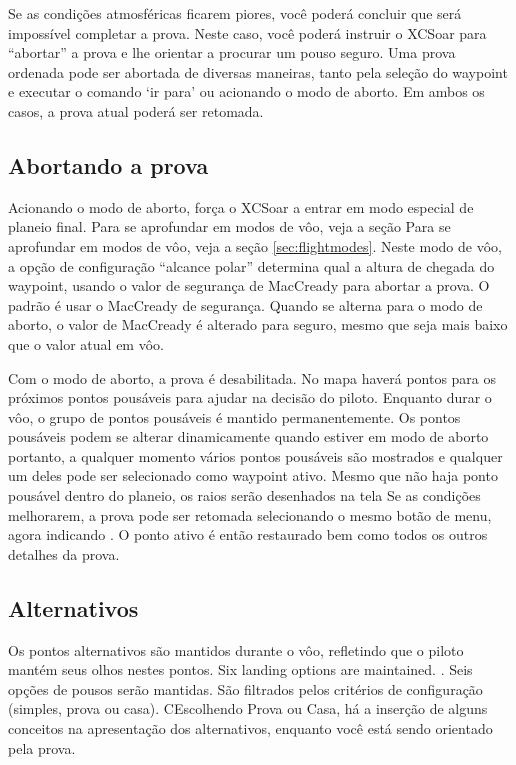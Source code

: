 Se as condições atmosféricas ficarem piores, você poderá concluir que será impossível completar a prova.  Neste caso, você poderá instruir o XCSoar para “abortar” a prova e lhe orientar a procurar um pouso seguro.  Uma prova ordenada pode ser abortada de diversas maneiras, tanto pela seleção do waypoint e executar o comando ‘ir para’ ou acionando o modo de aborto.  Em ambos os casos, a prova atual poderá ser retomada.

\subsection*{Abortando a prova}\label{sec:taskabort}
Acionando o modo de aborto, força o XCSoar a entrar em modo especial de planeio final.  Para se aprofundar em modos de vôo, veja a seção  Para se aprofundar em modos de vôo, veja a seção  \ref{sec:flightmodes}. Neste modo de vôo, a opção de configuração “alcance polar” determina qual a altura de chegada do waypoint, usando o valor de segurança de MacCready para abortar a prova.  O padrão é usar o MacCready de segurança.  Quando se alterna para o modo de aborto, o valor de MacCready é alterado para seguro, mesmo que seja mais baixo que o valor atual em vôo.

Com o modo de aborto, a prova é desabilitada.  No mapa haverá pontos para os próximos pontos pousáveis para ajudar na decisão do piloto.  Enquanto durar o vôo, o grupo de pontos pousáveis é mantido permanentemente.  Os pontos pousáveis podem se alterar dinamicamente quando estiver em modo de aborto portanto, a qualquer momento vários pontos pousáveis são mostrados e qualquer um deles pode ser selecionado como waypoint ativo.  Mesmo que não haja ponto pousável dentro do planeio, os raios serão desenhados na tela
Se as condições melhorarem, a prova pode ser retomada selecionando o mesmo botão de menu, agora indicando . O ponto ativo é então restaurado bem como todos os outros detalhes da prova.

\subsection*{Alternativos} \label{sec:alternates}
Os pontos alternativos são mantidos durante o vôo, refletindo que o piloto mantém seus olhos nestes pontos. Six landing 
options are maintained. .  Seis opções de pousos serão mantidas.  São filtrados pelos critérios de configuração (simples, prova ou casa).  
CEscolhendo Prova ou Casa, há a inserção de alguns conceitos na apresentação dos alternativos, enquanto você está sendo orientado pela prova. 

